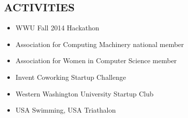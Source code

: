 \documentclass[line,margin]{res}
\begin{document}
\begin{resume}
\section{ACTIVITIES}
	\begin{itemize} \itemsep -3pt
	\item WWU Fall 2014 Hackathon
	\item Association for Computing Machinery national member
	\item Association for Women in Computer Science member
	\item Invent Coworking Startup Challenge
	\item Western Washington University Startup Club
	\item USA Swimming, USA Triathalon
	\end{itemize}


\end{resume}
\end{document}
